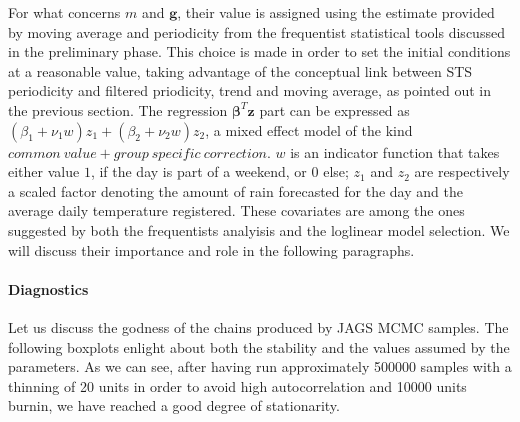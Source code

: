 \documentclass[11pt,twoside]{report}
\begin{document}
For what concerns $ m $ and $ \mathbf{g} $, their value is assigned using the estimate provided by moving average and periodicity from the frequentist statistical tools discussed in the preliminary phase. This choice is made in order to set the initial conditions at a reasonable value, taking advantage of the conceptual link between STS periodicity and filtered priodicity, trend and moving average, as pointed out in the previous section. The regression $ \boldsymbol{\beta}^T\mathbf{z} $ part can be expressed as $ (\beta_1+\nu_1w)z_1 + (\beta_2+\nu_2w)z_2$, a mixed effect model of the kind $ \mathit{common\ value + group\ specific\ correction} $. $ w $ is an indicator function that takes either value $ 1 $, if the day is part of a weekend, or $ 0 $ else; $ z_1 $ and $ z_2 $ are respectively a scaled factor denoting the amount of rain forecasted for the day and the average daily temperature registered. These covariates are among the ones suggested by both the frequentists analyisis and the loglinear model selection. We will discuss their importance and role in the following paragraphs.

\paragraph{Diagnostics}
Let us discuss the godness of the chains produced by JAGS MCMC samples.
The following boxplots enlight about both the stability and the values assumed by the parameters. As we can see, after having run approximately 500000 samples with a thinning of 20 units in order to avoid high autocorrelation and 10000 units burnin, we have reached a good degree of stationarity.
\end{document}
